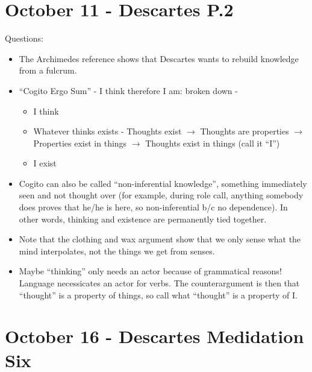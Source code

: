 \documentclass{report}
\begin{document}
\section{October 11 - Descartes P.2}

Questions:
\begin{itemize}
\item The Archimedes reference shows that Descartes wants to rebuild knowledge from a fulcrum.
\item "`Cogito Ergo Sum"' - I think therefore I am: broken down - 
\begin{itemize}
\item I think
\item Whatever thinks exists - Thoughts exist $\rightarrow$ Thoughts are properties $\rightarrow$ Properties exist in things $\rightarrow$ Thoughts exist in things (call it "`I"')
\item I exist
\end{itemize}
\item Cogito can also be called "`non-inferential knowledge"', something immediately seen and not thought over (for example, during role call, anything somebody does proves that he/he is here, so non-inferential b/c no dependence). In other words, thinking and existence are permanently tied together. 
\item Note that the clothing and wax argument show that we only sense what the mind interpolates, not the things we get from senses. 
\item Maybe "`thinking"' only needs an actor because of grammatical reasons! Language necessicates an actor for verbs. The counterargument is then that "`thought"' is a property of things, so call what "`thought"' is a property of I.
\end{itemize}

\section{October 16 - Descartes Medidation Six}
\end{document}
